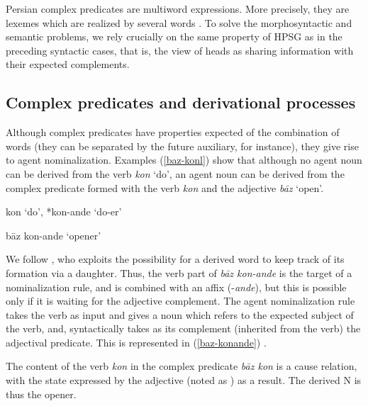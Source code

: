\documentclass[output=paper]{langsci/langscibook}
\begin{document}
	 Persian complex predicates are multiword expressions. More precisely, they are lexemes which are realized by several words \citep{BS2010}. To solve the morphosyntactic and semantic problems, we rely crucially on the same property of HPSG as in the preceding syntactic cases, that is, the view of heads as sharing information with their expected complements. 
	
	\subsection{Complex predicates and derivational processes}
	
	
	Although complex predicates have properties expected of the combination of words (they can be separated by the future auxiliary, for instance), they give rise to agent nominalization. Examples (\ref{baz-konl}) show that although no agent noun can be derived from the verb  \textit{kon} `do', an agent noun can be derived from the complex predicate formed with the verb  \textit{kon} and the adjective  \textit{b\=az} `open'. 
	
	
	
	
	\begin{exe}
		\ex \label{baz-konl}
		\begin{xlist} 
			
			\ex kon `do', *kon-ande `do-er'
			
			\ex b\=az kon-ande `opener'
			
		\end{xlist}
	\end{exe}
	
	We follow \cite{MuellerPersian}, who exploits the possibility for a derived word to keep track of its formation via a daughter. Thus,  the verb part of \textit{b\=az kon-ande} is the target of a nominalization rule, and is combined with an affix (-\textit{ande}), but this is possible only if it is waiting for the adjective complement. The agent nominalization rule takes the verb as input and gives a noun which refers to the expected subject of the verb, and, syntactically takes as its complement (inherited from the verb) the adjectival predicate. This is represented in (\ref{baz-konande}) \citep[adapted from][]{MuellerPersian}.
	
	The content of the verb \textit{kon} in the complex predicate \textit{b\=az kon} is a cause relation, with the state expressed by the adjective (noted as ) as a result. The derived N is thus the opener.
	
\end{document}

